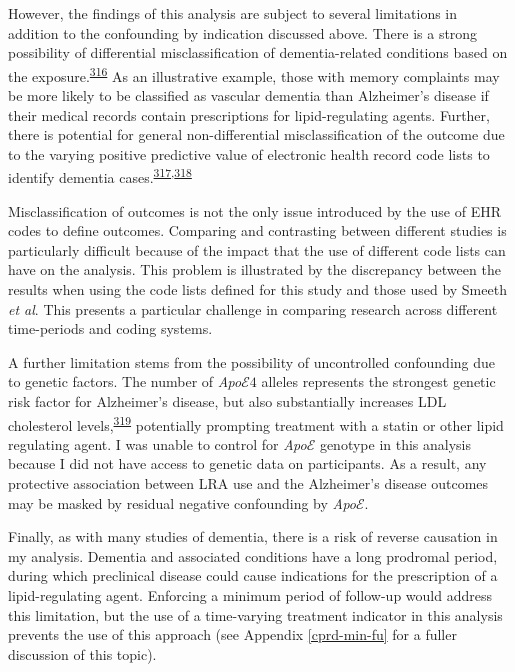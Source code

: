\documentclass[a4paper, twoside]{templates/ociamthesis}
\begin{document}
However, the findings of this analysis are subject to several limitations in addition to the confounding by indication discussed above. There is a strong possibility of differential misclassification of dementia-related conditions based on the exposure.\textsuperscript{\protect\hyperlink{ref-porta2014}{316}} As an illustrative example, those with memory complaints may be more likely to be classified as vascular dementia than Alzheimer's disease if their medical records contain prescriptions for lipid-regulating agents. Further, there is potential for general non-differential misclassification of the outcome due to the varying positive predictive value of electronic health record code lists to identify dementia cases.\textsuperscript{\protect\hyperlink{ref-wilkinson2018}{317},\protect\hyperlink{ref-mcguinness2019validity}{318}}

Misclassification of outcomes is not the only issue introduced by the use of EHR codes to define outcomes. Comparing and contrasting between different studies is particularly difficult because of the impact that the use of different code lists can have on the analysis. This problem is illustrated by the discrepancy between the results when using the code lists defined for this study and those used by Smeeth \emph{et al}. This presents a particular challenge in comparing research across different time-periods and coding systems.

A further limitation stems from the possibility of uncontrolled confounding due to genetic factors. The number of \emph{Apo}\(\mathcal{E}4\) alleles represents the strongest genetic risk factor for Alzheimer's disease, but also substantially increases LDL cholesterol levels,\textsuperscript{\protect\hyperlink{ref-bennet2007}{319}} potentially prompting treatment with a statin or other lipid regulating agent. I was unable to control for \emph{Apo}\(\mathcal{E}\) genotype in this analysis because I did not have access to genetic data on participants. As a result, any protective association between LRA use and the Alzheimer's disease outcomes may be masked by residual negative confounding by \emph{Apo}\(\mathcal{E}\).

Finally, as with many studies of dementia, there is a risk of reverse causation in my analysis. Dementia and associated conditions have a long prodromal period, during which preclinical disease could cause indications for the prescription of a lipid-regulating agent. Enforcing a minimum period of follow-up would address this limitation, but the use of a time-varying treatment indicator in this analysis prevents the use of this approach (see Appendix \ref{cprd-min-fu} for a fuller discussion of this topic).
\end{document}
